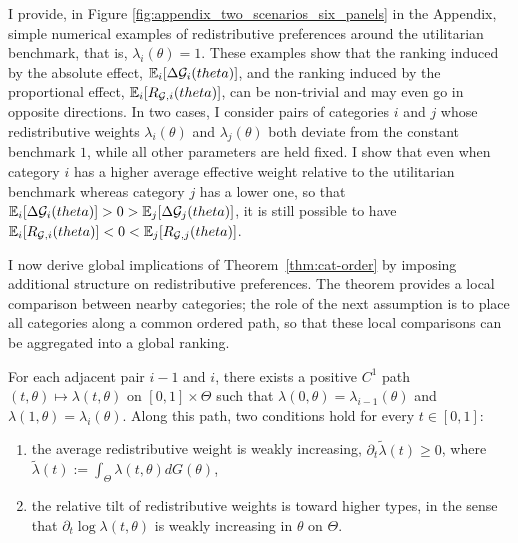 \documentclass{class}
\begin{document}
I provide, in Figure \ref{fig:appendix_two_scenarios_six_panels} in the Appendix, simple numerical examples of redistributive preferences around the utilitarian benchmark, that is, \(\lambda_i(\theta)=1\). These examples show that the ranking induced by the absolute effect, \(\mathbb{E}_{i}\!\left[\Delta \mathcal{G}_i(theta)\right]\), and the ranking induced by the proportional effect, \(\mathbb{E}_{i}\!\left[R_{\mathcal{G},i}(theta)\right]\), can be non-trivial and may even go in opposite directions. In two cases, I consider pairs of categories \(i\) and \(j\) whose redistributive weights \(\lambda_i(\theta)\) and \(\lambda_j(\theta)\) both deviate from the constant benchmark \(1\), while all other parameters are held fixed. I show that even when category \(i\) has a higher average effective weight relative to the utilitarian benchmark whereas category \(j\) has a lower one, so that \(\mathbb{E}_{i}\!\left[\Delta \mathcal{G}_i(theta)\right] > 0 > \mathbb{E}_j\!\left[\Delta \mathcal{G}_j(theta)\right]\), it is still possible to have \(\mathbb{E}_{i}\!\left[R_{\mathcal{G},i}(theta)\right] < 0 < \mathbb{E}_j\!\left[R_{\mathcal{G},j}(theta)\right]\).

I now derive global implications of Theorem~\ref{thm:cat-order} by imposing additional structure on redistributive preferences. The theorem provides a local comparison between nearby categories; the role of the next assumption is to place all categories along a common ordered path, so that these local comparisons can be aggregated into a global ranking.

\renewcommand{\theassumption}{Order}
\begin{assumption}\label{ass:ordered-path}
For each adjacent pair \(i-1\) and \(i\), there exists a positive \(C^1\) path $(t,\theta)\mapsto \lambda(t,\theta) \text{ on }[0,1]\times\Theta$ such that \(\lambda(0,\theta)=\lambda_{i-1}(\theta)\) and \(\lambda(1,\theta)=\lambda_i(\theta)\). Along this path, two conditions hold for every \(t\in[0,1]\):

\begin{enumerate}[label=(\roman*), leftmargin=1cm]
\item the average redistributive weight is weakly increasing, $\partial_t \tilde\lambda(t)\ge 0$, where $\tilde\lambda(t):=\int_{\Theta} \lambda(t,\theta)dG(\theta)$,
\item the relative tilt of redistributive weights is toward higher types, in the sense that $\partial_t \log \lambda(t,\theta)$ is weakly increasing in \(\theta\) on \(\Theta\).
\end{enumerate}
\end{assumption}
\renewcommand{\theassumption}{\arabic{assumption}}
\end{document}
